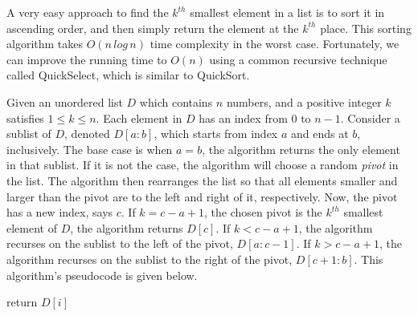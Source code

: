 \documentclass[12pt,english,]{article}
\let\origfigure\figure
\let\endorigfigure\endfigure
\renewenvironment{figure}[1][2] {
    \expandafter\origfigure\expandafter[H]
} {
    \endorigfigure
}
\begin{document}
A very easy approach to find the \(k^{th}\) smallest element in a list
is to sort it in ascending order, and then simply return the element at
the \(k^{th}\) place. This sorting algorithm takes \(O(n\,log\,n)\) time
complexity in the worst case. Fortunately, we can improve the running
time to \(O(n)\) using a common recursive technique called QuickSelect,
which is similar to QuickSort.

Given an unordered list \(D\) which contains \(n\) numbers, and a
positive integer \(k\) satisfies \(1 \leq k \leq n\). Each element in
\(D\) has an index from \(0\) to \(n-1\). Consider a sublist of \(D\),
denoted \(D[a:b]\), which starts from index \(a\) and ends at \(b\),
inclusively. The base case is when \(a = b\), the algorithm returns the
only element in that sublist. If it is not the case, the algorithm will
choose a random \emph{pivot} in the list. The algorithm then rearranges
the list so that all elements smaller and larger than the pivot are to
the left and right of it, respectively. Now, the pivot has a new index,
says \(c\). If \(k = c-a+1\), the chosen pivot is the \(k^{th}\)
smallest element of \(D\), the algorithm returns \(D[c]\). If
\(k < c-a+1\), the algorithm recurses on the sublist to the left of the
pivot, \(D[a:c-1]\). If \(k > c-a+1\), the algorithm recurses on the
sublist to the right of the pivot, \(D[c+1:b]\). This algorithm's
pseudocode is given below.

\begin{figure}[ht]
  \centering
  \begin{minipage}{.9\linewidth}
    {\LinesNotNumbered
    \SetAlgoRefName{}
    \begin{algorithm}[H]
    \SetAlgoLined
    \BlankLine
    \centering
    \begin{minipage}{.75\linewidth}
         {
            return $D[i]$
        }
    \end{minipage}
    \caption{\textsc{KthSmallest}$(D, a, b, k)$}
    \end{algorithm}}
  \end{minipage}
\end{figure}
\end{document}
